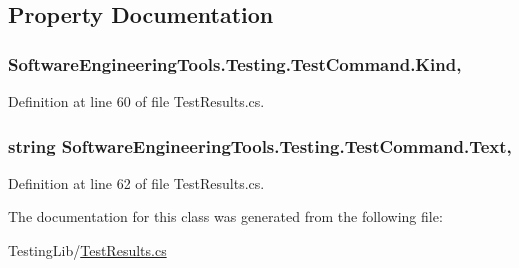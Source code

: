 \subsection{Property Documentation}
\hypertarget{class_software_engineering_tools_1_1_testing_1_1_test_command_aac3f92319409b1abb7b6eb9b25ee4550}{
\subsubsection[{Kind}]{ Software\+Engineering\+Tools.\+Testing.\+Test\+Command.\+Kind\hspace{0.3cm}{\ttfamily [get]}, {\ttfamily [set]}}}\label{class_software_engineering_tools_1_1_testing_1_1_test_command_aac3f92319409b1abb7b6eb9b25ee4550}


Definition at line 60 of file Test\+Results.\+cs.

\hypertarget{class_software_engineering_tools_1_1_testing_1_1_test_command_a42419031b0adefd524c4a2ba3d8cf15f}{
\subsubsection[{Text}]{\setlength{\rightskip}{0pt plus 5cm}string Software\+Engineering\+Tools.\+Testing.\+Test\+Command.\+Text\hspace{0.3cm}{\ttfamily [get]}, {\ttfamily [set]}}}\label{class_software_engineering_tools_1_1_testing_1_1_test_command_a42419031b0adefd524c4a2ba3d8cf15f}


Definition at line 62 of file Test\+Results.\+cs.



The documentation for this class was generated from the following file\+:\begin{DoxyCompactItemize}
\item 
Testing\+Lib/\hyperlink{_test_results_8cs}{Test\+Results.\+cs}\end{DoxyCompactItemize}
